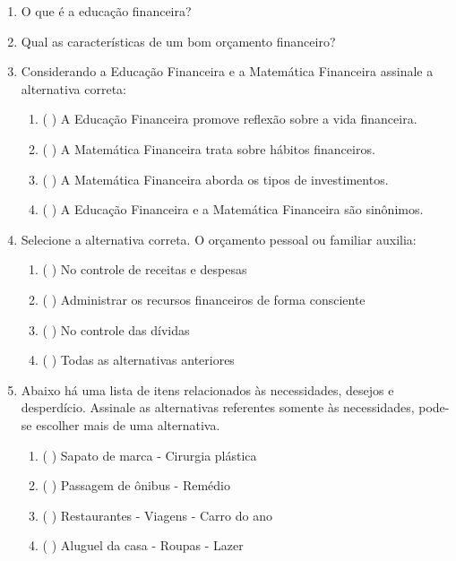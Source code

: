 \begin{enumerate}
    \item O que é a educação financeira?
    
    \item Qual as características de um bom orçamento financeiro?
    
    \item Considerando a Educação Financeira e a Matemática Financeira assinale a alternativa correta:
        \begin{enumerate}
            \item  (   ) A Educação Financeira promove reflexão sobre a vida financeira.
           \item   (   ) A Matemática Financeira trata sobre hábitos financeiros.
            \item  (   ) A Matemática Financeira aborda os tipos de investimentos.
            \item  (   ) A Educação Financeira e a Matemática Financeira são sinônimos.
        \end{enumerate}
    
    \item Selecione a alternativa correta. O orçamento pessoal ou familiar auxilia:
        \begin{enumerate} 
            \item (   ) No controle de receitas e despesas
            \item (   ) Administrar os recursos financeiros de forma consciente
            \item (   ) No controle das dívidas
            \item (   ) Todas as alternativas anteriores
        \end{enumerate}
        
    \item Abaixo há uma lista de itens relacionados às necessidades, desejos e desperdício. Assinale as alternativas referentes somente às necessidades, pode-se escolher mais de uma alternativa.
        \begin{enumerate}
            \item (   ) Sapato de marca - Cirurgia plástica
            \item (   ) Passagem de ônibus - Remédio
            \item (   ) Restaurantes - Viagens - Carro do ano
            \item (   ) Aluguel da casa - Roupas - Lazer
        \end{enumerate}
    

\end{enumerate}
